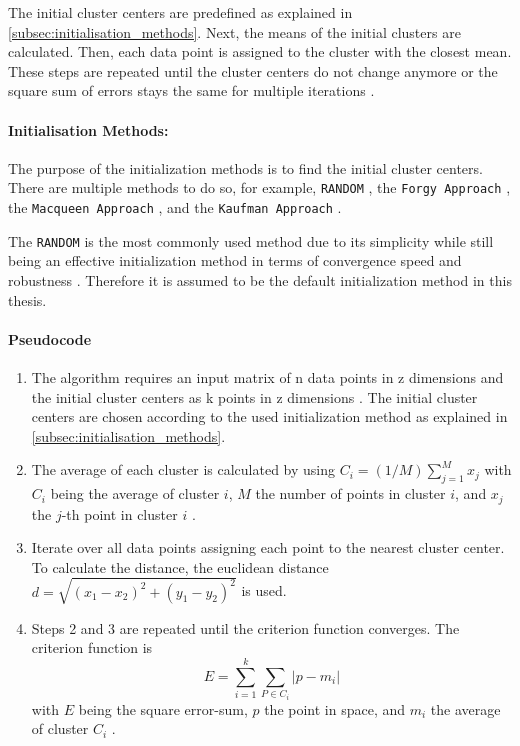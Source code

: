 The initial cluster centers are predefined as explained in \autoref{subsec:initialisation_methods}.
Next, the means of the initial clusters are calculated.
Then, each data point is assigned to the cluster with the closest mean.
These steps are repeated until the cluster centers do not change anymore or the square sum of errors stays the same for multiple iterations \cite{HAR-KMA}.

\paragraph*{Initialisation Methods:}
\label{subsec:initialisation_methods}
The purpose of the initialization methods is to find the initial cluster centers.
There are multiple methods to do so, for example, \texttt{RANDOM} \cite{PEN-ECI}, the \texttt{Forgy Approach} \cite{AND-CAA}, the \texttt{Macqueen Approach} \cite{MCQ-MCA}, and the \texttt{Kaufman Approach} \cite{KAU-FGD}.

The \texttt{RANDOM} is the most commonly used method due to its simplicity while still being an effective initialization method in terms of convergence speed and robustness \cite{PEN-ECI}.
Therefore it is assumed to be the default initialization method in this thesis.

\paragraph*{Pseudocode}
\begin{enumerate}
    \item The algorithm requires an input matrix of n data points in z dimensions and the initial cluster centers as k points in z dimensions \cite{HAR-KMA}.
          The initial cluster centers are chosen according to the used initialization method as explained in \autoref{subsec:initialisation_methods}.
    \item The average of each cluster is calculated by using $C_i = (1/M) \sum_{j=1}^{M}x_j$ with $C_i$ being the average of cluster $i$, $M$ the number of points in cluster $i$, and $x_j$ the $j$-th point in cluster $i$ \cite{SYA-IKC}.
    \item Iterate over all data points assigning each point to the nearest cluster center.
          To calculate the distance, the euclidean distance $d = \sqrt{(x_1-x_2)^2+(y_1-y_2)^2}$ is used.
    \item Steps 2 and 3 are repeated until the criterion function converges.
          The criterion function is \begin{equation}\label{eq:sse}E=\sum_{i=1}^{k} \sum_{P \in C_i}|p-m_i|\end{equation} with $E$ being the square error-sum, $p$ the point in space, and $m_i$ the average of cluster $C_i$ \cite{LIU-BDE}.
\end{enumerate}

